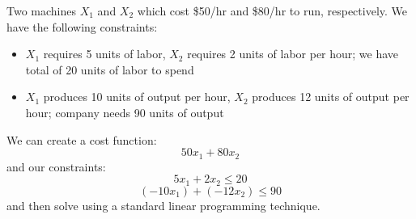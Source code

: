 \begin{problem}
	Two machines \(X_1\) and \(X_2\) which cost \$50/hr and \$80/hr to run, respectively. We have the following constraints:
	\begin{itemize}
		\item \(X_1\) requires 5 units of labor, \(X_2\) requires 2 units of labor per hour; we have total of 20 units of labor to spend
		\item \(X_1\) produces 10 units of output per hour, \(X_2\) produces 12 units of output per hour; company needs 90 units of output
	\end{itemize}
\end{problem}
\begin{answer}
	We can create a cost function:
	\[
		50x_1 + 80x_2
	\]
	and our constraints:
	\[
		5x_1 + 2x_2 \leq 20
	\]
	\[
		(-10x_1) + (-12x_2) \leq 90
	\]
	and then solve using a standard linear programming technique.
\end{answer}